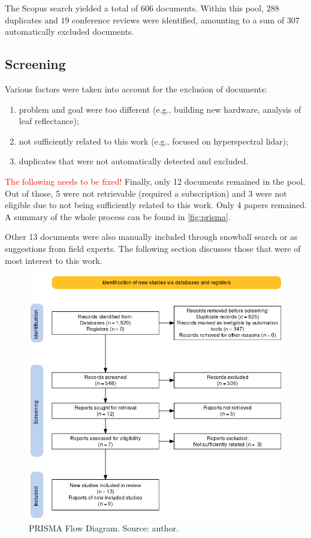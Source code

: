 The Scopus search yielded a total of $606$ documents. Within this pool, $288$ duplicates and $19$ conference reviews were identified, amounting to a sum of $307$ automatically excluded documents.

\subsection*{Screening}

Various factors were taken into account for the exclusion of documents:
\begin{enumerate}
    \item problem and goal were too different (e.g., building new hardware, analysis of leaf reflectance);
    \item not sufficiently related to this work (e.g., focused on hyperspectral \gls{lidar});
    \item duplicates that were not automatically detected and excluded.
\end{enumerate}

\textcolor{red}{The following needs to be fixed!}
Finally, only 12 documents remained in the pool. Out of those, 5 were not retrievable (required a subscription) and 3 were not eligible due to not being sufficiently related to this work. Only 4 papers remained. A summary of the whole process can be found in \autoref{fig:prisma}.

Other 13 documents were also manually included through snowball search or as suggestions from field experts. The following section discusses those that were of most interest to this work.


\begin{figure}[htb]
    \begin{center}
        \includegraphics[width=1\textwidth]{img/prisma.png}
    \end{center}
    \caption{\label{fig:prisma}PRISMA Flow Diagram. Source: author.}
\end{figure}


